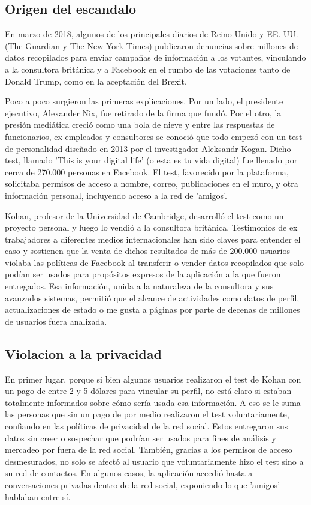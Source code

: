 \subsection{Origen del escandalo}

En marzo de 2018, algunos de los principales diarios de Reino Unido y EE. UU. (The Guardian y The New York Times) publicaron denuncias sobre millones de datos recopilados para enviar campañas de información a los votantes, vinculando a la consultora británica y a Facebook en el rumbo de las votaciones tanto de Donald Trump, como en la aceptación del Brexit.

Poco a poco surgieron las primeras explicaciones. Por un lado, el presidente ejecutivo, Alexander Nix, fue retirado de la firma que fundó. Por el otro, la presión mediática creció como una bola de nieve y entre las respuestas de funcionarios, ex empleados y consultores se conoció que todo empezó con un test de personalidad diseñado en 2013 por el investigador Aleksandr Kogan. Dicho test, llamado 'This is your digital life' (o esta es tu vida digital) fue llenado por cerca de 270.000 personas en Facebook. El test, favorecido por la plataforma, solicitaba permisos de acceso a nombre, correo, publicaciones en el muro, y otra información personal, incluyendo acceso a la red de 'amigos'. 

Kohan, profesor de la Universidad de Cambridge, desarrolló el test como un proyecto personal y luego lo vendió a la consultora británica. Testimonios de ex trabajadores a diferentes medios internacionales han sido claves para entender el caso y sostienen que la venta de dichos resultados de más de 200.000 usuarios violaba las políticas de Facebook al transferir o vender datos recopilados que solo podían ser usados para propósitos expresos de la aplicación a la que fueron entregados. 
Esa información, unida a la naturaleza de la consultora y sus avanzados sistemas, permitió que el alcance de actividades como datos de perfil, actualizaciones de estado o me gusta a páginas por parte de decenas de millones de usuarios fuera analizada. 

\subsection{Violacion a la privacidad}

En primer lugar, porque si bien algunos usuarios realizaron el test de Kohan con un pago de entre 2 y 5 dólares para vincular su perfil, no está claro si estaban totalmente informados sobre cómo sería usada esa información. A eso se le suma las personas que sin un pago de por medio realizaron el test voluntariamente, confiando en las políticas de privacidad de la red social. Estos entregaron sus datos sin creer o sospechar que podrían ser usados para fines de análisis y mercadeo por fuera de la red social. También, gracias a los permisos de acceso desmesurados, no solo se afectó al usuario que voluntariamente hizo el test sino a su red de contactos. En algunos casos, la aplicación accedió hasta a conversaciones privadas dentro de la red social, exponiendo lo que 'amigos' hablaban entre sí. 

